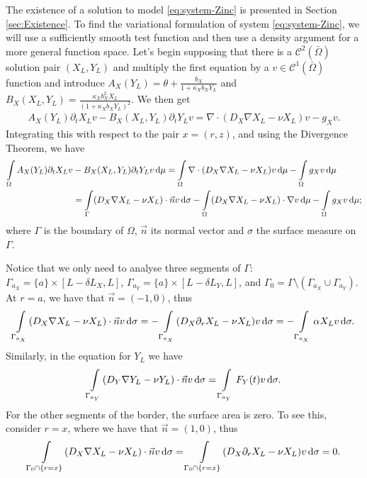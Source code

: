\documentclass[11pt]{article}
\begin{document}
The existence of a solution to model \eqref{eq:system-Zinc} is presented in Section \ref{sec:Existence}.
To find the variational formulation of system \eqref{eq:system-Zinc}, we will use a sufficiently smooth test function and then use a density argument for a more general function space. Let's begin supposing that there is a $\mathcal{C}^2 (\bar \Omega)$ solution pair $(X_L,Y_L)$ and multiply the first equation by a $v \in \mathcal{C}^1 (\bar\Omega)$ function and introduce $A_X(Y_L) = \theta + \frac{b_X}{1 + \kappa_X b_X Y_L}$ and $B_X(X_L,Y_L) = \frac{\kappa_X b_X^2 X_L}{(1+\kappa_X b_X Y_L)^2}$. We then get
\begin{align}
    A_X(Y_L) \partial_t X_L v - B_X(X_L,Y_L) \partial_t Y_L v = \nabla \cdot (D_X \nabla X_L - \nu X_L) v - g_X v.
\end{align}
Integrating this with respect to the pair \(x = (r,z)\), and using the Divergence Theorem, we have
\begin{align}
    \int\limits_\Omega
    A_X(Y_L) \partial_t X_L v &- B_X(X_L,Y_L) \partial_t Y_L v \dif \mu = 
    \int\limits_\Omega
    \nabla \cdot (D_X \nabla X_L - \nu X_L) v  \dif \mu
    -\int\limits_\Omega g_X v \dif \mu
    \\
    &=
    \int\limits_\Gamma
    (D_X \nabla X_L - \nu X_L) \cdot \vec{n} v
    \dif \sigma
    -\int\limits_\Omega
    (D_X \nabla X_L - \nu X_L) \cdot \nabla v  \dif \mu
    -\int\limits_\Omega g_X v \dif \mu;
\end{align}
where $\Gamma$ is the boundary of $\Omega$, $\vec{n}$ its normal vector and $\sigma$ the surface measure on $\Gamma$. 

Notice that we only need to analyse three segments of $\Gamma$: $\Gamma_{a_X} = \{a\}\times [L-\delta L_X,L]$, $\Gamma_{a_Y} = \{a\} \times [L - \delta L_Y, L]$, and $ \Gamma_0 = \Gamma \setminus (\Gamma_{a_X} \cup \Gamma_{a_Y})$. At $r = a$, we have that $ \vec{n} = (-1,0)$, thus
\begin{align}
    \int\limits_{\Gamma_{a_X}}
    (D_X \nabla X_L - \nu X_L) \cdot \vec{n} v    \dif \sigma
    =
    -
    \int\limits_{\Gamma_{a_X}}
    (D_X \partial_r X_L - \nu X_L) v    \dif \sigma
    =
    -\int\limits_{\Gamma_{a_X}}
    \alpha X_L v    \dif \sigma.
\end{align}
Similarly, in the equation for \(Y_L\) we have
\begin{align}
    \int\limits_{\Gamma_{a_Y}}
    (D_Y \nabla Y_L - \nu Y_L) \cdot \vec{n} v    \dif \sigma
    =
    \int\limits_{\Gamma_{a_Y}}
    F_Y(t) v    \dif \sigma.
\end{align}
For the other segments of the border, the surface area is zero. To see this, consider $r = x$, where we have that $ \vec{n} = (1,0)$, thus
\begin{align}
    \int\limits_{\Gamma_0 \cap \{r=x\}}
    (D_X \nabla X_L - \nu X_L) \cdot \vec{n} v    \dif \sigma
    =
    \int\limits_{\Gamma_0 \cap \{r=x\}}
    (D_X \partial_r X_L - \nu X_L) v    \dif \sigma
    =
    0.
\end{align}
\end{document}
